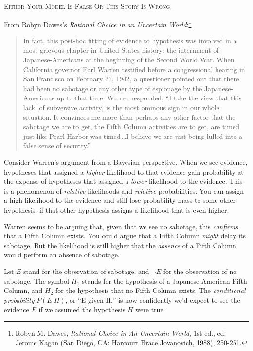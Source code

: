 \begin{center}
  \textsc{Either Your Model Is False Or This Story Is Wrong.}
\end{center}

\myendsectiontext


\bigskip


{
 From Robyn Dawes's \textit{Rational Choice in an
Uncertain World}:\footnote{Robyn M. Dawes, \textit{Rational Choice in An Uncertain World},
1st ed., ed. Jerome Kagan (San Diego, CA: Harcourt Brace Jovanovich,
1988), 250-251.}}

\begin{quote}
{
 In fact, this post-hoc fitting of evidence to hypothesis was
involved in a most grievous chapter in United States history: the
internment of Japanese-Americans at the beginning of the Second World
War. When California governor Earl Warren testified before a
congressional hearing in San Francisco on February 21, 1942, a
questioner pointed out that there had been no sabotage or any other
type of espionage by the Japanese-Americans up to that time. Warren
responded, ``I take the view that this lack [of
subversive activity] is the most ominous sign in our whole situation.
It convinces me more than perhaps any other factor that the sabotage we
are to get, the Fifth Column activities are to get, are timed just like
Pearl Harbor was timed\,\ldots I believe we are just being lulled into a
false sense of security.''}
\end{quote}

{
 Consider Warren's argument from a Bayesian
perspective. When we see evidence, hypotheses that assigned a
\textit{higher} likelihood to that evidence gain probability at the
expense of hypotheses that assigned a \textit{lower} likelihood to the
evidence. This is a phenomenon of \textit{relative} likelihoods and
\textit{relative} probabilities. You can assign a high likelihood to
the evidence and still lose probability mass to some other hypothesis,
if that other hypothesis assigns a likelihood that is even higher.}

{
 Warren seems to be arguing that, given that we see no sabotage,
this \textit{confirms} that a Fifth Column exists. You could argue that
a Fifth Column \textit{might} delay its sabotage. But the likelihood is
still higher that the \textit{absence} of a Fifth Column would perform
an absence of sabotage.}

{
 Let $E$ stand for the observation of sabotage, and $\lnot E$ for
the observation of no sabotage. The symbol $H_{1}$ stands
for the hypothesis of a Japanese-American Fifth Column, and
$H_{2}$ for the hypothesis that no Fifth Column exists. The
\textit{conditional probability} $P(E|H)$, or
``E given H,'' is how confidently
we'd expect to see the evidence $E$ if we assumed the
hypothesis $H$ were true.}

